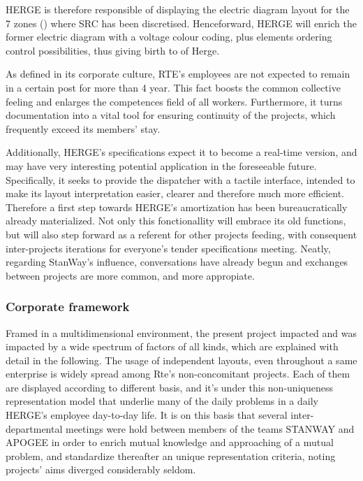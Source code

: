 


HERGE is therefore responsible of displaying the electric diagram layout for the 7 zones () where SRC has been discretised. Henceforward, HERGE will enrich the former electric diagram with a voltage colour coding, plus  elements ordering control possibilities, thus giving birth to  of Herge. 

As defined in its corporate culture, RTE's employees are not expected to remain in a certain post for more than 4 year. This fact boosts the common collective feeling and enlarges the competences field of all workers. Furthermore, it turns  documentation into a vital tool for ensuring continuity of the projects, which frequently exceed its members' stay. 

Additionally, HERGE's specifications expect it to become a real-time version, and may have very interesting potential application in the foreseeable future. Specifically, it seeks to provide the dispatcher with a tactile interface, intended to make its layout interpretation easier, clearer and therefore much more efficient. Therefore a first step towards HERGE's amortization has been bureaucratically already materialized. Not only this fonctionallity will embrace its old functions, but will also step forward as a referent for other projects feeding, with consequent inter-projects iterations for everyone's tender specifications meeting. Neatly, regarding StanWay's influence, conversations have already begun and exchanges between projects are more common, and more appropiate.

\subsubsection{Corporate framework}
\label{subsubsec:Intro:thesis-purpose:Framework:corporate-framework}
Framed in a multidimensional environment, the present project impacted and was impacted by a wide spectrum of factors of all kinds, which are explained with detail in the following.
The usage of independent layouts, even throughout a same enterprise is widely spread among Rte's non-concomitant projects. Each of them are displayed according to different basis, and it's under this non-uniqueness representation model that underlie many of the daily problems in a daily HERGE's employee day-to-day life. It is on this basis that several inter-departmental  meetings were hold between members of the teams STANWAY and APOGEE in order to enrich mutual knowledge and approaching of a mutual problem, and standardize thereafter an unique representation criteria, noting projects' aims diverged considerably seldom.

